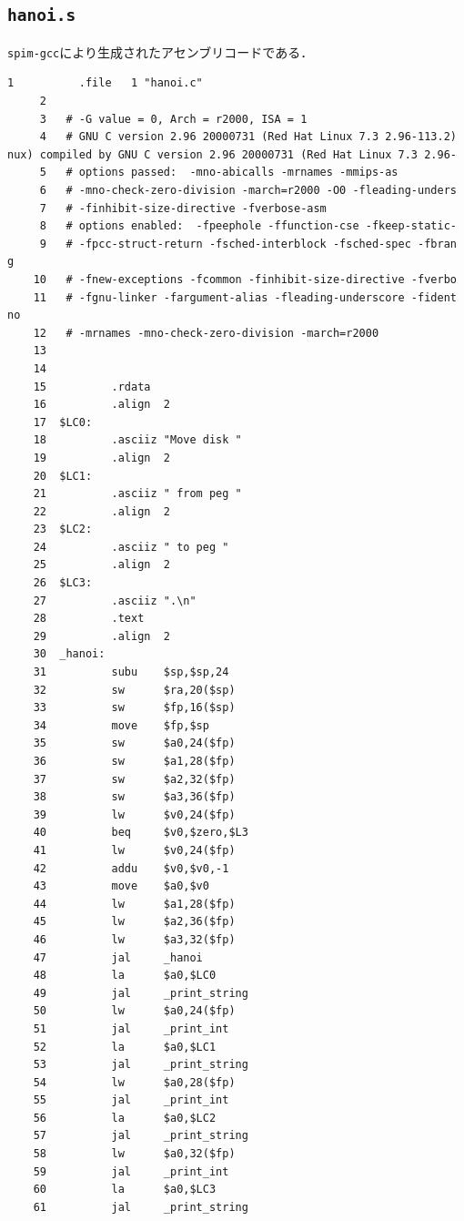 \subsection{\texttt{hanoi.s}} \label{sec:hanoi.s}
\verb|spim-gcc|により生成されたアセンブリコードである．
\begin{Verbatim}[fontsize=\small, baselinestretch=0.8]
     1          .file   1 "hanoi.c"
     2
     3   # -G value = 0, Arch = r2000, ISA = 1
     4   # GNU C version 2.96 20000731 (Red Hat Linux 7.3 2.96-113.2)
nux) compiled by GNU C version 2.96 20000731 (Red Hat Linux 7.3 2.96-
     5   # options passed:  -mno-abicalls -mrnames -mmips-as
     6   # -mno-check-zero-division -march=r2000 -O0 -fleading-unders
     7   # -finhibit-size-directive -fverbose-asm
     8   # options enabled:  -fpeephole -ffunction-cse -fkeep-static-
     9   # -fpcc-struct-return -fsched-interblock -fsched-spec -fbran
g
    10   # -fnew-exceptions -fcommon -finhibit-size-directive -fverbo
    11   # -fgnu-linker -fargument-alias -fleading-underscore -fident
no
    12   # -mrnames -mno-check-zero-division -march=r2000
    13
    14
    15          .rdata
    16          .align  2
    17  $LC0:
    18          .asciiz "Move disk "
    19          .align  2
    20  $LC1:
    21          .asciiz " from peg "
    22          .align  2
    23  $LC2:
    24          .asciiz " to peg "
    25          .align  2
    26  $LC3:
    27          .asciiz ".\n"
    28          .text
    29          .align  2
    30  _hanoi:
    31          subu    $sp,$sp,24
    32          sw      $ra,20($sp)
    33          sw      $fp,16($sp)
    34          move    $fp,$sp
    35          sw      $a0,24($fp)
    36          sw      $a1,28($fp)
    37          sw      $a2,32($fp)
    38          sw      $a3,36($fp)
    39          lw      $v0,24($fp)
    40          beq     $v0,$zero,$L3
    41          lw      $v0,24($fp)
    42          addu    $v0,$v0,-1
    43          move    $a0,$v0
    44          lw      $a1,28($fp)
    45          lw      $a2,36($fp)
    46          lw      $a3,32($fp)
    47          jal     _hanoi
    48          la      $a0,$LC0
    49          jal     _print_string
    50          lw      $a0,24($fp)
    51          jal     _print_int
    52          la      $a0,$LC1
    53          jal     _print_string
    54          lw      $a0,28($fp)
    55          jal     _print_int
    56          la      $a0,$LC2
    57          jal     _print_string
    58          lw      $a0,32($fp)
    59          jal     _print_int
    60          la      $a0,$LC3
    61          jal     _print_string

\end{Verbatim}

